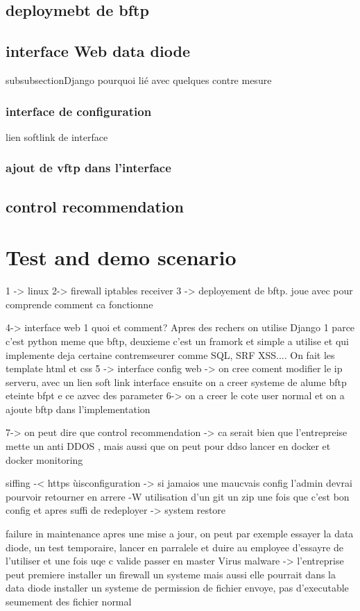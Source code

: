 \documentclass[a4paper,10pt]{article}
\begin{document}
\subsection{deploymebt de bftp}

\subsection{interface Web data diode}
subsubsection{Django} pourquoi lié avec quelques contre mesure

\subsubsection{interface de configuration}
lien softlink de interface
\subsubsection{ajout de vftp dans l'interface}
\subsection{control recommendation}
\section{Test and demo scenario}

1 -> linux 
2-> firewall iptables receiver
3 -> deployement de bftp. joue avec pour comprende comment ca fonctionne

4-> interface web 1 quoi et comment? Apres des rechers on utilise Django 1 parce c'est python meme que bftp, deuxieme c'est un framork et simple a utilise et qui implemente deja certaine contremseurer comme SQL, SRF XSS.... On fait les template html et css
5 -> interface config web  -> on cree coment modifier le ip serveru, avec un lien soft link interface ensuite on a creer systeme de alume bftp eteinte bfpt e ce azvec des parameter
6-> on a creer le cote user normal et  on a ajoute bftp dans l'implementation

7-> on peut dire que control recommendation -> ca serait bien que l'entrepreise mette un anti DDOS , mais aussi que on peut pour ddso lancer en docker et docker monitoring

siffing -< https 
ùisconfiguration -> si jamaios une maucvais config l'admin devrai pourvoir retourner en arrere -W utilisation d'un git un zip une fois que c'est bon config et apres suffi de redeployer -> system restore

failure in maintenance apres une mise a jour, on peut par exemple essayer la data diode, un test temporaire, lancer en parralele et duire au employee d'essayre de l'utiliser et une fois uqe c valide passer en master
 Virus malware -> l'entreprise peut premiere installer un firewall un systeme mais aussi elle pourrait dans la data diode installer un systeme de permission de fichier envoye, pas d'executable seumement des fichier normal
 
\end{document}
